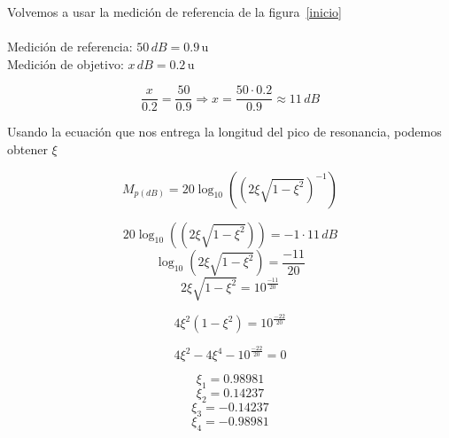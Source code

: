 Volvemos a usar la medición de referencia de la figura~\ref{inicio} \\ \\
Medición de referencia: $50\,dB = 0{.}9\,\mathrm{u}$ \\
Medición de objetivo: $x\,dB = 0{.}2\,\mathrm{u}$

\begin{equation*}
    \dfrac{x}{0{.}2} = \dfrac{50}{0{.}9} \Longrightarrow
     x = \dfrac{50 \cdot 0{.}2}{0{.}9} \approx 11 \, dB
\end{equation*} 

\vspace{1cm}

Usando la ecuación que nos entrega la longitud del pico de resonancia, podemos
obtener $\xi$

\begin{equation*}
    M_{p(dB)} = 20 \log_{10}
    {\left({\left(
         2\xi{\sqrt{1 - \xi^2}}
    \right)}^{-1}\right) }
\end{equation*}

\begin{multicols}{2}

\begin{equation*}
    20 \log_{10}
    {\left({\left(
         2\xi{\sqrt{1 - \xi^2}}
    \right)}
    \right)}  = {-1} \cdot 11 \, dB
\end{equation*}
\begin{equation*}
    \log_{10}
    \left(
         2\xi{\sqrt{1 - \xi^2}}
    \right)  =  \frac{-11}{20}
\end{equation*}
\begin{equation*}
        2\xi{\sqrt{1 - \xi^2}}
    =  10^{\frac{-11}{20}}
\end{equation*}

\begin{equation*}
    4\xi^2
    \left(   
    {1 - \xi^2}
    \right)
    =  10^{\frac{-22}{20}}
\end{equation*}

\begin{equation*}
    4\xi^2
    -4\xi^4
    -10^{\frac{-22}{20}}
    =  0
\end{equation*}

\begin{equation*}
    \xi_1 = 0{.}98981
\end{equation*}
\begin{equation*}
    \xi_2 = 0{.}14237
\end{equation*}
\begin{equation*}
    \xi_3 = -0{.}14237
\end{equation*}
\begin{equation*}
    \xi_4 = -0{.}98981
\end{equation*}

\end{multicols}

